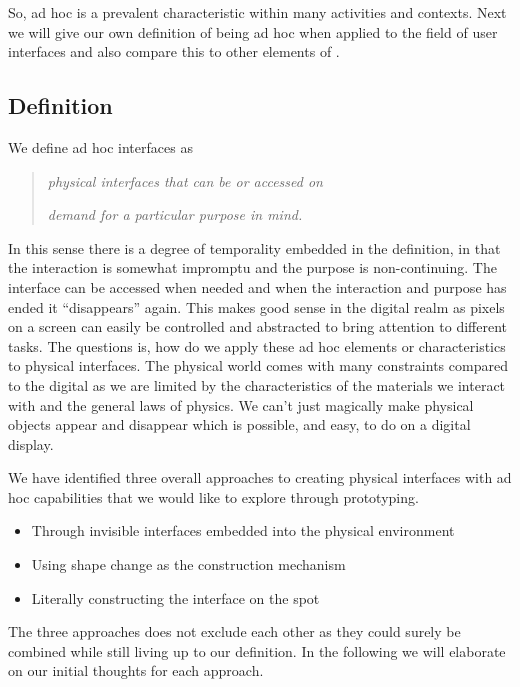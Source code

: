 So, ad hoc is a prevalent characteristic within many activities and contexts.
Next we will give our own definition of being ad hoc when applied to the field of user interfaces and also compare this to other elements of .

\subsection{Definition} 
We define ad hoc interfaces as 

\begin{quotation}\label{adhoc:definition}
\emph{physical interfaces that can be  or accessed on} 

\emph{demand for a particular purpose in mind. }
\end{quotation}

In this sense there is a degree of temporality embedded in the definition, in that the interaction is somewhat impromptu and the purpose is non-continuing.
The interface can be accessed when needed and when the interaction and purpose has ended it ``disappears'' again.
This makes good sense in the digital realm as pixels on a screen can easily be controlled and abstracted to bring attention to different tasks.
The questions is, how do we apply these ad hoc elements or characteristics to physical interfaces.
The physical world comes with many constraints compared to the digital as we are limited by the characteristics of the materials we interact with and the general laws of physics.
We can't just magically make physical objects appear and disappear which is possible, and easy, to do on a digital display.

We have identified three overall approaches to creating physical interfaces with ad hoc capabilities that we would like to explore through prototyping.

\begin{itemize}
	\item{Through invisible interfaces embedded into the physical environment}
	\item{Using shape change as the construction mechanism}
	\item{Literally constructing the interface on the spot}
\end{itemize}

The three approaches does not exclude each other as they could surely be combined while still living up to our definition.
In the following we will elaborate on our initial thoughts for each approach.

